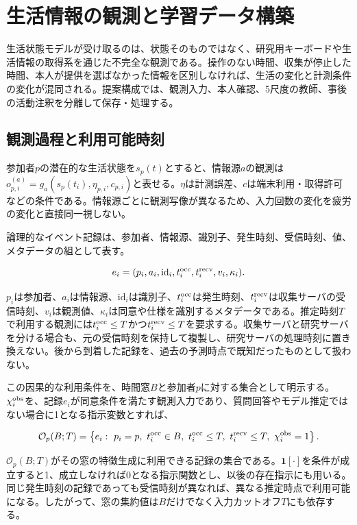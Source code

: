 \chapter{生活情報の観測と学習データ構築}
\label{chap:observations}

生活状態モデルが受け取るのは、状態そのものではなく、研究用キーボードや生活情報の取得系を通じた不完全な観測である。操作のない時間、収集が停止した時間、本人が提供を選ばなかった情報を区別しなければ、生活の変化と計測条件の変化が混同される。提案構成では、観測入力、本人確認、5尺度の教師、事後の活動注釈を分離して保存・処理する。

\section{観測過程と利用可能時刻}

参加者\(p\)の潜在的な生活状態を\(s_p(t)\)とすると、情報源\(a\)の観測は\(o^{(a)}_{p,i}=g_a(s_p(t_i),\eta_{p,i},c_{p,i})\)と表せる。\(\eta\)は計測誤差、\(c\)は端末利用・取得許可などの条件である。情報源ごとに観測写像が異なるため、入力回数の変化を疲労の変化と直接同一視しない。

論理的なイベント記録は、参加者、情報源、識別子、発生時刻、受信時刻、値、メタデータの組として表す。

\[
e_i=(p_i,a_i,\mathrm{id}_i,t_i^{\rm occ},t_i^{\rm recv},v_i,\kappa_i).
\]

\(p_i\)は参加者、\(a_i\)は情報源、\(\mathrm{id}_i\)は識別子、\(t_i^{\rm occ}\)は発生時刻、\(t_i^{\rm recv}\)は収集サーバの受信時刻、\(v_i\)は観測値、\(\kappa_i\)は同意や仕様を識別するメタデータである。推定時刻\(T\)で利用する観測には\(t_i^{\rm occ}\le T\)かつ\(t_i^{\rm recv}\le T\)を要求する。収集サーバと研究サーバを分ける場合も、元の受信時刻を保持して複製し、研究サーバの処理時刻に置き換えない。後から到着した記録を、過去の予測時点で既知だったものとして扱わない。

この因果的な利用条件を、時間窓\(B\)と参加者\(p\)に対する集合として明示する。\(\chi_i^{\rm obs}\)を、記録\(e_i\)が同意条件を満たす観測入力であり、質問回答やモデル推定ではない場合に1となる指示変数とすれば、

\[
\mathcal O_p(B;T)=
\left\{e_i:\ p_i=p,\ t_i^{\rm occ}\in B,\
t_i^{\rm occ}\le T,\ t_i^{\rm recv}\le T,\ \chi_i^{\rm obs}=1\right\}.
\]

\(\mathcal O_p(B;T)\)がその窓の特徴生成に利用できる記録の集合である。\(\mathbf1[\cdot]\)を条件が成立すると1、成立しなければ0となる指示関数とし、以後の存在指示にも用いる。同じ発生時刻の記録であっても受信時刻が異なれば、異なる推定時点で利用可能になる。したがって、窓の集約値は\(B\)だけでなく入力カットオフ\(T\)にも依存する。

